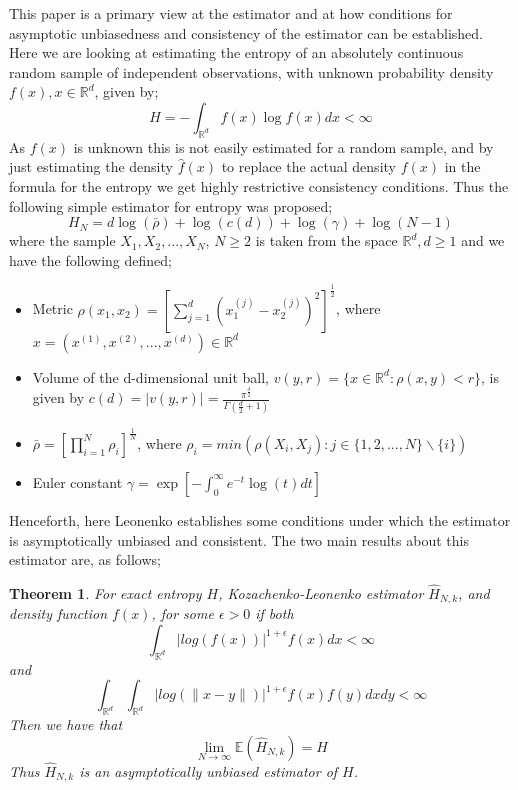 \documentclass{article}
\newtheorem{theorem}{Theorem}
\begin{document}
This paper is a primary view at the estimator and at how conditions for asymptotic unbiasedness and consistency of the estimator can be established. Here we are looking at estimating the entropy of an absolutely continuous random sample of independent observations, with unknown probability density $f(x), x \in \mathbb{R}^{d}$, given by;
\begin{equation}
H = - \int_{\mathbb{R}^{d}} f (x) \log f(x) dx < \infty
\end{equation}
As $f(x)$ is unknown this is not easily estimated for a random sample, and by just estimating the density $\hat{f}(x)$ to replace the actual density $f(x)$ in the formula for the entropy we get highly restrictive consistency conditions. Thus the following simple estimator for entropy was proposed;
\begin{equation}
H_{N} = d \log(\bar{\rho } ) + \log (c(d)) + \log (\gamma) + \log (N-1)
\end{equation}
where the sample $X_{1}, X_{2}, ..., X_{N}$, $N\geq 2$ is taken from the space $\mathbb{R}^{d}, d \geq 1$ and we have the following defined;
\begin{itemize}
\item Metric $\rho (x_{1}, x_{2}) = \left[ \sum_{j=1}^{d} (x_{1}^{(j)} - x_{2}^{(j)} )^{2} \right]^{\frac{1}{2}}$, where $x = (x^{(1)}, x^{(2)}, ..., x^{(d)}) \in \mathbb{R}^{d}$
\item Volume of the d-dimensional unit ball, $v(y, r) = \{ x \in \mathbb{R}^{d} : \rho (x, y) < r \}$, is given by $c(d) = |v(y, r)| = \frac{\pi^{\frac{d}{2}}}{\Gamma ( \frac{d}{2} + 1 )}$
\item $\bar{\rho} = \left[ \prod_{i=1}^{N} \rho_{i} \right]^{\frac{1}{N}}$, where $\rho_{i} = min(\rho (X_{i}, X_{j}) : j \in \{1, 2, ..., N\} \backslash \{i\})$
\item Euler constant $\gamma = \exp \left[ - \int_{0}^{\infty} e^{-t} \log(t) dt \right]$
\end{itemize}

Henceforth, here Leonenko establishes some conditions under which the estimator is asymptotically unbiased and consistent. The two main results about this estimator are, as follows;
\begin{theorem} \label{paper1_T1}
For exact entropy $H$, Kozachenko-Leonenko estimator $\hat{H}_{N,k}$, and density function $f(x)$, for some $\epsilon > 0$ if both
\begin{equation} \label{paper1_T1_eq1}
\int_{\mathbb{R}^{d}} | log(f(x))|^{1 + \epsilon} f(x) dx < \infty 
\end{equation}
and
\begin{equation} \label{paper1_T1_eq2}
\int_{\mathbb{R}^{d}} \int_{\mathbb{R}^{d}} | log(\|x-y\|)|^{1+ \epsilon} f(x) f(y) dx dy < \infty
\end{equation}
Then we have that 
\begin{equation} 
\lim_{N \to \infty} \mathbb{E} (\hat{H}_{N, k}) = H \nonumber
\end{equation}
Thus $\hat{H}_{N, k}$ is an asymptotically unbiased estimator of $H$.
\end{theorem}
\end{document}
